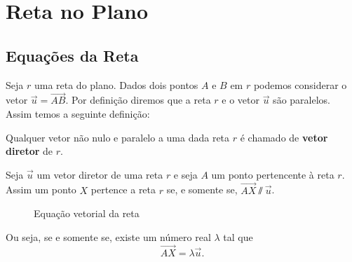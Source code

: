 
\chapter{Reta no Plano} %
\label{cha:reta_no_plano}

\section{Equa\c{c}\~oes da Reta} %
\label{sec:equacoes_da_reta}

Seja $r$ uma reta do plano. Dados dois pontos $A$ e $B$ em $r$ podemos considerar o vetor $\vec{u} = \vec{AB}$. Por defini\c{c}\~ao diremos que a reta $r$ e o vetor $\vec{u}$ s\~ao paralelos. Assim temos a seguinte defini\c{c}\~ao:
\begin{definicao}
  Qualquer vetor n\~ao nulo e paralelo a uma dada reta $r$ \'e chamado de \textbf{vetor diretor} de $r$.
\end{definicao}

Seja $\vec{u}$ um vetor diretor de uma reta $r$ e seja $A$ um ponto pertencente \`a reta $r$. Assim um ponto $X$ pertence a reta $r$ se, e somente se, $\vec{AX}\varparallel\vec{u}$.
\begin{figure}[!h]
  \centering
  \caption{Equação vetorial da reta}
\end{figure}

Ou seja, se e somente se, existe um n\'umero real $\lambda$ tal que
\begin{equation}\label{equacao_vetorial_reta_plano}
  \vec{AX} = \lambda\vec{u}.
\end{equation}

